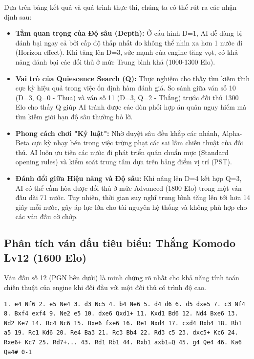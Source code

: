 Dựa trên bảng kết quả và quá trình thực thi, chúng ta có thể rút ra các nhận định sau:

\begin{itemize}
    \item \textbf{Tầm quan trọng của Độ sâu (Depth):} Ở cấu hình D=1, AI dễ dàng bị đánh bại ngay cả bởi cấp độ thấp nhất do không thể nhìn xa hơn 1 nước đi (Horizon effect). Khi tăng lên D=3, sức mạnh của engine tăng vọt, có khả năng đánh bại các đối thủ ở mức Trung bình khá (1000-1300 Elo).
    \item \textbf{Vai trò của Quiescence Search (Q):} Thực nghiệm cho thấy tìm kiếm tĩnh cực kỳ hiệu quả trong việc ổn định hàm đánh giá. So sánh giữa ván số 10 (D=3, Q=0 - Thua) và ván số 11 (D=3, Q=2 - Thắng) trước đối thủ 1300 Elo cho thấy Q giúp AI tránh được các đòn phối hợp ăn quân nguy hiểm mà tìm kiếm giới hạn độ sâu thường bỏ lỡ.
    \item \textbf{Phong cách chơi "Kỷ luật":} Nhờ duyệt sâu đều khắp các nhánh, Alpha-Beta cực kỳ nhạy bén trong việc trừng phạt các sai lầm chiến thuật của đối thủ. AI luôn ưu tiên các nước đi phát triển quân chuẩn mực (Standard opening rules) và kiểm soát trung tâm dựa trên bảng điểm vị trí (PST).
    \item \textbf{Đánh đổi giữa Hiệu năng và Độ sâu:} Khi nâng lên D=4 kết hợp Q=3, AI có thể cầm hòa được đối thủ ở mức Advanced (1800 Elo) trong một ván đấu dài 71 nước. Tuy nhiên, thời gian suy nghĩ trung bình tăng lên tới hơn 14 giây mỗi nước, gây áp lực lớn cho tài nguyên hệ thống và không phù hợp cho các ván đấu cờ chớp.
\end{itemize}

\subsection{Phân tích ván đấu tiêu biểu: Thắng Komodo Lv12 (1600 Elo)}

Ván đấu số 12 (PGN bên dưới) là minh chứng rõ nhất cho khả năng tính toán chiến thuật của engine khi đối đầu với một đối thủ có trình độ cao.

\begin{lstlisting}[frame=single, basicstyle=\ttfamily\scriptsize, breaklines=true]
1. e4 Nf6 2. e5 Ne4 3. d3 Nc5 4. b4 Ne6 5. d4 d6 6. d5 dxe5 7. c3 Nf4 8. Bxf4 exf4 9. Ne2 e5 10. dxe6 Qxd1+ 11. Kxd1 Bd6 12. Nd4 Bxe6 13. Nd2 Ke7 14. Bc4 Nc6 15. Bxe6 fxe6 16. Re1 Nxd4 17. cxd4 Bxb4 18. Rb1 a5 19. Rc1 Kd6 20. Re4 Ba3 21. Rc3 Bb4 22. Rd3 c5 23. dxc5+ Kc6 24. Rxe6+ Kc7 25. Rd7+... 43. Rd1 Rb1 44. Rxb1 axb1=Q 45. g4 Qe4 46. Ka6 Qa4# 0-1
\end{lstlisting}

